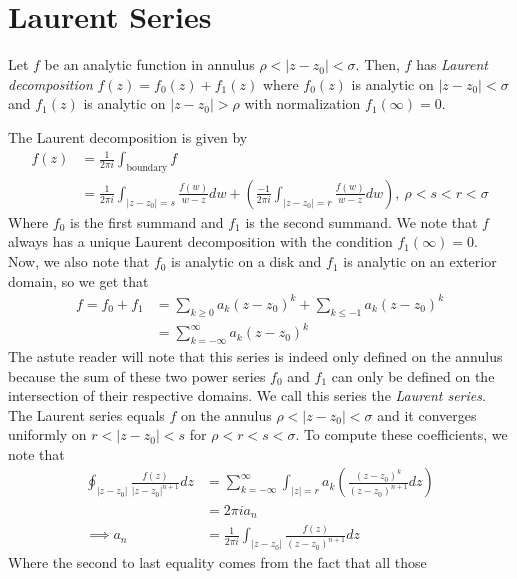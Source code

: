 \documentclass[11pt,leqno,oneside]{amsart}
\begin{document}
  \section*{Laurent Series}
  \begin{defn}
    Let $f$ be an analytic function in annulus $\rho < |z-z_0| <
    \sigma$. Then, $f$ has \emph{Laurent decomposition} $f(z) = f_0(z)
    + f_1(z)$ where $f_0(z)$ is analytic on $|z-z_0| < \sigma$ and
    $f_1(z)$ is analytic on $|z-z_0| > \rho$ with normalization $f_1(\infty) = 0$.
  \end{defn}
  The Laurent decomposition is given by
  \begin{align*}
    f(z) & = \frac{1}{2 \pi i} \int_{\text{boundary}} f \\
    \ & = \frac{1}{2 \pi i} \int_{|z-z_0| = s} \frac{f(w)}{w-z} dw +
        \left( \frac{-1}{2 \pi i} \int_{|z-z_0| = r}
        \frac{f(w)}{w-z}dw \right), \ \rho < s < r < \sigma
  \end{align*}
  Where $f_0$ is the first summand and $f_1$ is the second
  summand. We note that $f$ always has a unique Laurent decomposition
  with the condition $f_1(\infty) = 0$. Now, we also note that $f_0$
  is analytic on a disk and $f_1$ is analytic on an exterior domain,
  so we get that
  \begin{align*}
    f = f_0+f_1 & = \sum_{k \geq 0} a_k(z-z_0)^k + \sum_{k \leq -1}
                  a_k(z-z_0)^k \\
    \ & = \sum_{k=-\infty}^\infty a_k(z-z_0)^k
  \end{align*}
  The astute reader will note that this series is indeed only defined
  on the annulus because the sum of these two power series $f_0$ and
  $f_1$ can only be defined on the intersection of their respective
  domains. We call this series the \emph{Laurent series}. The Laurent
  series equals $f$ on the annulus $\rho < |z-z_0| < \sigma$ and it
  converges uniformly on $r < |z-z_0| < s$ for $\rho < r < s <
  \sigma$. To compute these coefficients, we note that
  \begin{align*}
    \oint_{|z-z_0|} \frac{f(z)}{|z-z_0|^{n+1}} dz
    & = \sum_{k=-\infty}^\infty \int_{|z|=r} a_k \left(
      \frac{(z-z_0)^k}{(z-z_0)^{n+1}} dz \right) \\
    \ & = 2 \pi i a_n \\
    \implies a_n & = \frac{1}{2 \pi i} \int_{|z-z_0|}
                 \frac{f(z)}{(z-z_0)^{n+1}}dz
  \end{align*}
  Where the second to last equality comes from the fact that all those
\end{document}
